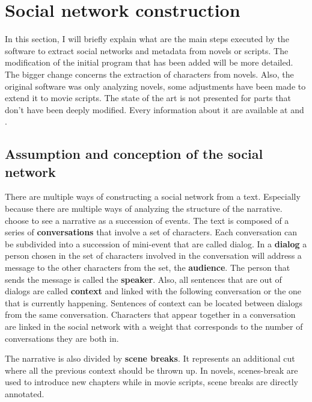 \documentclass[a4paper, 12pt]{report}
\begin{document}
\chapter{Social network construction}

In this section, I will briefly explain what are the main steps executed by the software to extract social networks and metadata from novels or scripts. The modification of the initial program that has been added will be more detailed. The bigger change concerns the extraction of characters from novels. Also, the original software was only analyzing novels, some adjustments have been made to extend it to movie scripts. The state of the art is not presented for parts that don't have been deeply modified. Every information about it are available at \cite{original} and \cite{original_thesis}.

\section{Assumption and conception of the social network}
There are multiple ways of constructing a social network from a text. Especially because there are multiple ways of analyzing the structure of the narrative. \cite{original} choose to see a narrative as a succession of events. The text is composed of a series of \textbf{conversations} that involve a set of characters. Each conversation can be subdivided into a succession of mini-event that are called dialog. In a \textbf{dialog} a person chosen in the set of characters involved in the conversation will address a message to the other characters from the set, the \textbf{audience}. The person that sends the message is called the \textbf{speaker}. Also, all sentences that are out of dialogs are called \textbf{context} and linked with the following conversation or the one that is currently happening. Sentences of context can be located between dialogs from the same conversation. Characters that appear together in a conversation are linked in the social network with a weight that corresponds to the number of conversations they are both in.

The narrative is also divided by \textbf{scene breaks}. It represents an additional cut where all the previous context should be thrown up. In novels, scenes-break are used to introduce new chapters while in movie scripts, scene breaks are directly annotated.
\end{document}
